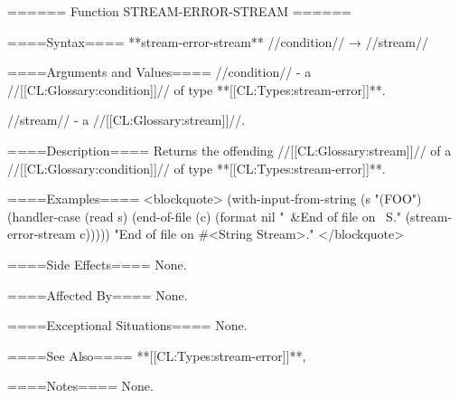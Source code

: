 ====== Function STREAM-ERROR-STREAM ======

====Syntax====
**stream-error-stream** //condition// → //stream//

====Arguments and Values====
//condition// - a //[[CL:Glossary:condition]]// of type **[[CL:Types:stream-error]]**.

//stream// - a //[[CL:Glossary:stream]]//.

====Description====
Returns the offending //[[CL:Glossary:stream]]// of a //[[CL:Glossary:condition]]// of type **[[CL:Types:stream-error]]**.

====Examples==== <blockquote> (with-input-from-string (s "(FOO") (handler-case (read s) (end-of-file (c) (format nil "~&End of file on ~S." (stream-error-stream c))))) "End of file on #<String Stream>." </blockquote>

====Side Effects====
None.

====Affected By====
None.

====Exceptional Situations====
None.

====See Also====
**[[CL:Types:stream-error]]**,{\secref\Conditions}

====Notes====
None.

